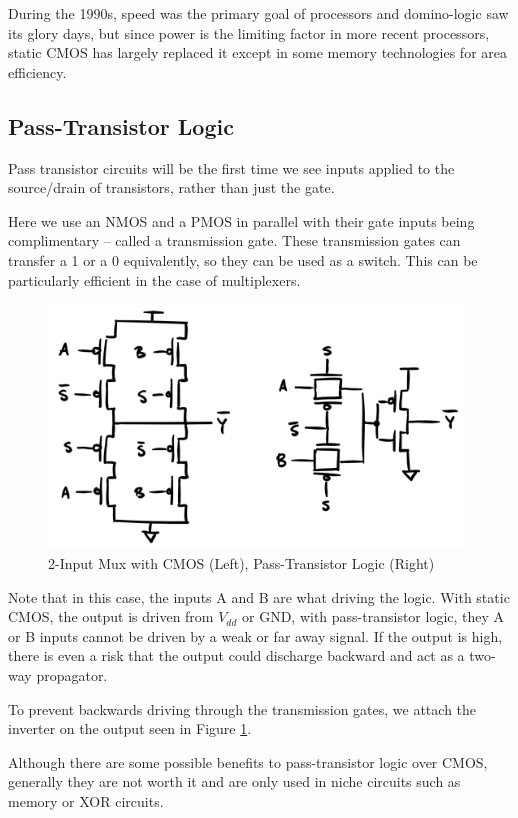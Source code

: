 \documentclass{article}
\begin{document}
 During the 1990s, speed was the primary goal of processors and domino-logic saw its glory days, but since power is the limiting factor in more recent processors, static CMOS has largely replaced it except in some memory technologies for area efficiency.
     
\subsection{Pass-Transistor Logic}

Pass transistor circuits will be the first time we see inputs applied to the source/drain of transistors, rather than just the gate.

Here we use an NMOS and a PMOS in parallel with their gate inputs being complimentary -- called a transmission gate. These transmission gates can transfer a 1 or a 0 equivalently, so they can be used as a switch. This can be particularly efficient in the case of multiplexers. 

\begin{figure}[ht!]
\centering
\includegraphics[width=110mm]{trans.png}
\caption{2-Input Mux with CMOS (Left), Pass-Transistor Logic (Right)}
\label{PassTrans}
\end{figure}

Note that in this case, the inputs A and B are what driving the logic. With static CMOS, the output is driven from $V_{dd}$ or GND, with pass-transistor logic, they A or B inputs cannot be driven by a weak or far away signal. If the output is high, there is even a risk that the output could discharge backward and act as a two-way propagator. 

To prevent backwards driving through the transmission gates, we attach the inverter on the output seen in Figure \ref{PassTrans}. 

Although there are some possible benefits to pass-transistor logic over CMOS, generally they are not worth it and are only used in niche circuits such as memory or XOR circuits.
\end{document}

